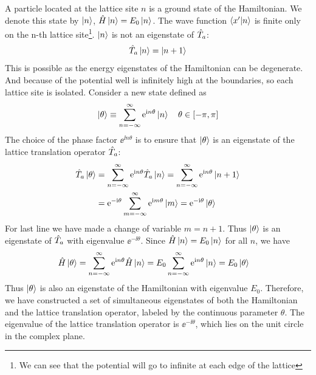 A particle located at the lattice site $n$ is a ground state of the Hamiltonian. We denote this state by $\ket{n}$, $\hat{H} \ket{n} = E_0 \ket{n}$. The wave function $\braket{x'|n}$ is finite only on the n-th lattice site\footnote{We can see that the potential will go to infinite at each edge of the lattice}. $\ket{n}$ is not an eigenstate of $\hat{T}_a$: 
\begin{align}
    \hat{T}_a \ket{n} = \ket{n+1}
\end{align}
This is possible as the energy eigenstates of the Hamiltonian can be degenerate. And because of the potential well is infinitely high at the boundaries, so each lattice site is isolated. Consider a new state defined as 
\begin{align}
    \ket{\theta} \equiv \sum_{n=-\infty}^{\infty} \mathrm{e}^{\mathrm{i} n \theta} \ket{n} \quad \theta \in [-\pi, \pi]
\end{align}
The choice of the phase factor $\ee^{\ii n \theta}$ is to ensure that $\ket{\theta}$ is an eigenstate of the lattice translation operator $\hat{T}_a$:
\begin{align}
    \hat{T}_a \ket{\theta} &= \sum_{n=-\infty}^{\infty} \mathrm{e}^{\mathrm{i} n \theta} \hat{T}_a \ket{n} = \sum_{n=-\infty}^{\infty} \mathrm{e}^{\mathrm{i} n \theta} \ket{n+1} \notag \\
    &= \mathrm{e}^{- \mathrm{i} \theta} \sum_{m=-\infty}^{\infty} \mathrm{e}^{\mathrm{i} m \theta} \ket{m} = \mathrm{e}^{- \mathrm{i} \theta} \ket{\theta}
\end{align}
For last line we have made a change of variable $m = n+1$. Thus $\ket{\theta}$ is an eigenstate of $\hat{T}_a$ with eigenvalue $\ee^{- \ii \theta}$. Since $\hat{H} \ket{n} = E_0 \ket{n}$ for all $n$, we have 
\begin{align}
    \hat{H} \ket{\theta} &= \sum_{n=-\infty}^{\infty} \mathrm{e}^{\mathrm{i} n \theta} \hat{H} \ket{n} = E_0 \sum_{n=-\infty}^{\infty} \mathrm{e}^{\mathrm{i} n \theta} \ket{n} = E_0 \ket{\theta}
\end{align}
Thus $\ket{\theta}$ is also an eigenstate of the Hamiltonian with eigenvalue $E_0$. Therefore, we have constructed a set of simultaneous eigenstates of both the Hamiltonian and the lattice translation operator, labeled by the continuous parameter $\theta$. The eigenvalue of the lattice translation operator is $\ee^{- \ii \theta}$, which lies on the unit circle in the complex plane.
